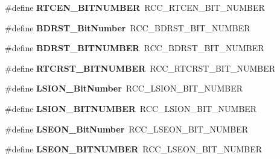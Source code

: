\begin{DoxyCompactItemize}
\#define {\bfseries R\+T\+C\+E\+N\+\_\+\+B\+I\+T\+N\+U\+M\+B\+ER}~R\+C\+C\+\_\+\+R\+T\+C\+E\+N\+\_\+\+B\+I\+T\+\_\+\+N\+U\+M\+B\+ER
\item 
\mbox{\label{group___h_a_l___r_c_c___aliased_gae6718158034388d8fde8caaa28ffe8b9}} 
\#define {\bfseries B\+D\+R\+S\+T\+\_\+\+Bit\+Number}~R\+C\+C\+\_\+\+B\+D\+R\+S\+T\+\_\+\+B\+I\+T\+\_\+\+N\+U\+M\+B\+ER
\item 
\mbox{\label{group___h_a_l___r_c_c___aliased_ga8a86677bfcc1259edf9b9a5f85e7e04a}} 
\#define {\bfseries B\+D\+R\+S\+T\+\_\+\+B\+I\+T\+N\+U\+M\+B\+ER}~R\+C\+C\+\_\+\+B\+D\+R\+S\+T\+\_\+\+B\+I\+T\+\_\+\+N\+U\+M\+B\+ER
\item 
\mbox{\label{group___h_a_l___r_c_c___aliased_ga0cfaa60ebd031d12bff625ca896f1fd5}} 
\#define {\bfseries R\+T\+C\+R\+S\+T\+\_\+\+B\+I\+T\+N\+U\+M\+B\+ER}~R\+C\+C\+\_\+\+R\+T\+C\+R\+S\+T\+\_\+\+B\+I\+T\+\_\+\+N\+U\+M\+B\+ER
\item 
\mbox{\label{group___h_a_l___r_c_c___aliased_ga3f9dbe50769ce2a63ae12520433b9b40}} 
\#define {\bfseries L\+S\+I\+O\+N\+\_\+\+Bit\+Number}~R\+C\+C\+\_\+\+L\+S\+I\+O\+N\+\_\+\+B\+I\+T\+\_\+\+N\+U\+M\+B\+ER
\item 
\mbox{\label{group___h_a_l___r_c_c___aliased_ga240275048c246bf22b5fce8ff4f7b33d}} 
\#define {\bfseries L\+S\+I\+O\+N\+\_\+\+B\+I\+T\+N\+U\+M\+B\+ER}~R\+C\+C\+\_\+\+L\+S\+I\+O\+N\+\_\+\+B\+I\+T\+\_\+\+N\+U\+M\+B\+ER
\item 
\mbox{\label{group___h_a_l___r_c_c___aliased_ga9d9171281f96c7cd004520985e3ae27f}} 
\#define {\bfseries L\+S\+E\+O\+N\+\_\+\+Bit\+Number}~R\+C\+C\+\_\+\+L\+S\+E\+O\+N\+\_\+\+B\+I\+T\+\_\+\+N\+U\+M\+B\+ER
\item 
\mbox{\label{group___h_a_l___r_c_c___aliased_ga9dcf3f6a2fd518a7fd96f96280f81f8f}} 
\#define {\bfseries L\+S\+E\+O\+N\+\_\+\+B\+I\+T\+N\+U\+M\+B\+ER}~R\+C\+C\+\_\+\+L\+S\+E\+O\+N\+\_\+\+B\+I\+T\+\_\+\+N\+U\+M\+B\+ER
\item 
\mbox{\label{group___h_a_l___r_c_c___aliased_ga6af20e20f5b32e8a85f607ea43c338df}} 

\end{DoxyCompactItemize}
